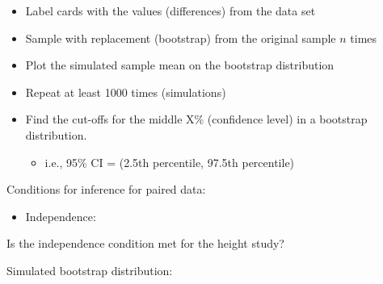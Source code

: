 \documentclass[
]{report}
\newenvironment{Shaded}{\begin{snugshade}}{\end{snugshade}}
\newcommand{\AttributeTok}[1]{\textcolor[rgb]{0.13,0.29,0.53}{#1}}
\newcommand{\CommentTok}[1]{\textcolor[rgb]{0.56,0.35,0.01}{\textit{#1}}}
\newcommand{\DecValTok}[1]{\textcolor[rgb]{0.00,0.00,0.81}{#1}}
\newcommand{\FloatTok}[1]{\textcolor[rgb]{0.00,0.00,0.81}{#1}}
\newcommand{\FunctionTok}[1]{\textcolor[rgb]{0.13,0.29,0.53}{\textbf{#1}}}
\newcommand{\NormalTok}[1]{#1}
\newcommand{\SpecialCharTok}[1]{\textcolor[rgb]{0.81,0.36,0.00}{\textbf{#1}}}
\providecommand{\tightlist}{%
  \setlength{\itemsep}{0pt}\setlength{\parskip}{0pt}}
\begin{document}
\begin{itemize}
\item
  Label cards with the values (differences) from the data set
\item
  Sample with replacement (bootstrap) from the original sample \(n\) times
\item
  Plot the simulated sample mean on the bootstrap distribution
\item
  Repeat at least 1000 times (simulations)
\item
  Find the cut-offs for the middle X\% (confidence level) in a bootstrap distribution.

  \begin{itemize}
  \tightlist
  \item
    i.e., 95\% CI = (2.5th percentile, 97.5th percentile)
  \end{itemize}
\end{itemize}

\newpage

Conditions for inference for paired data:

\begin{itemize}
\tightlist
\item
  Independence:
\end{itemize}

\vspace{0.5in}

Is the independence condition met for the height study?

\vspace{0.5in}

Simulated bootstrap distribution:

\begin{Shaded}
\end{Shaded}
\end{document}
